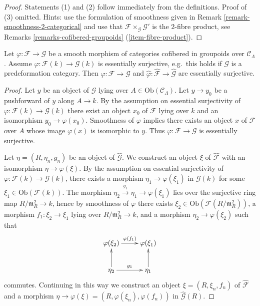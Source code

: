 \begin{proof}
Statements (1) and (2) follow immediately from the definitions.
Proof of (3) omitted. Hints: use the formulation of smoothness given in
Remark \ref{remark-smoothness-2-categorical}
and use that $\mathcal{F} \times_{\mathcal{G}} \mathcal{G}'$
is the $2$-fibre product, see
Remarks \ref{remarks-cofibered-groupoids} (\ref{item-fibre-product}).
\end{proof}

\begin{lemma}
\label{lemma-smooth-morphism-essentially-surjective}
Let $\varphi: \mathcal{F} \to \mathcal{G}$ be a smooth morphism of 
categories cofibered in groupoids over $\mathcal{C}_\Lambda$.  Assume 
$\varphi : \mathcal{F}(k) \to \mathcal{G}(k)$ is essentially surjective, 
e.g.\ this holds if $\mathcal{G}$ is a predeformation 
category. Then
$\varphi : \mathcal{F} \to \mathcal{G}$ and
$\widehat{\varphi} : \widehat{\mathcal{F}} \to \widehat{\mathcal{G}}$
are essentially surjective.
\end{lemma}

\begin{proof}
Let $y$ be an object of $\mathcal{G}$ lying over
$A \in \text{Ob}(\mathcal{C}_\Lambda)$. Let $y \to y_0$ be a pushforward
of $y$ along $A \to k$. By the assumption on essential surjectivity of 
$\varphi: \mathcal{F}(k) \to \mathcal{G}(k)$ there exist an object
$x_0$ of $\mathcal{F}$ lying over $k$ and an isomorphism
$y_0 \to \varphi(x_0)$. Smoothness of $\varphi$ implies there exists
an object $x$ of $\mathcal{F}$ over $A$ whose image $\varphi(x)$
is isomorphic to $y$. Thus $\varphi : \mathcal{F} \to \mathcal{G}$
is essentially surjective.

\medskip\noindent
Let $\eta = (R,\eta_{n},g_n)$ be an object of $\widehat{\mathcal{G}}$.  We 
construct an object $\xi$ of $\widehat{\mathcal{F}}$ with an isomorphism
$\eta \to \varphi(\xi)$. By the assumption on essential surjectivity of 
$\varphi : \mathcal{F}(k) \to \mathcal{G}(k)$, there exists a morphism 
$\eta_1 \to \varphi(\xi_1)$ in $\mathcal{G}(k)$ for some
$\xi_1 \in \text{Ob}(\mathcal{F}(k))$. The morphism
$\eta_2 \xrightarrow{g_1} \eta_1 \to \varphi(\xi_1)$
lies over the surjective ring map $R/\mathfrak m_R^2 \to k$, hence
by smoothness of $\varphi$ there exists
$\xi_2 \in \text{Ob}(\mathcal{F}(R/\mathfrak m_R^2))$, a 
morphism $f_1: \xi_2 \to \xi_1$ lying over
$R/\mathfrak m_R^2 \to k$, and a morphism
$\eta_2 \to \varphi(\xi_2)$ such that 
$$
\xymatrix{
\varphi(\xi_2)  \ar[r]^{\varphi(f_1)} &  \varphi(\xi_{1})   \\
\eta_2   \ar[u] \ar[r]^{g_1}  & \eta_1  \ar[u] \\
}
$$
commutes. Continuing in this way we construct an object
$\xi = (R, \xi_n, f_n)$ of $\widehat{\mathcal{F}}$ and a morphism
$\eta \to \varphi(\xi) = (R, \varphi(\xi_n), \varphi(f_n))$
in $\widehat{\mathcal{G}}(R)$.
\end{proof}

